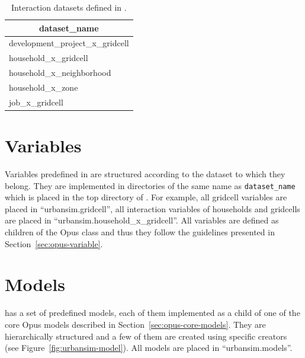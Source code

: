 \begin{table}
\begin{center}
\begin{tabular}{|l|}\hline
\multicolumn{1}{|c|}{dataset_name}  \\\hline\hline
development_project_x_gridcell \\
household_x_gridcell \\
household_x_neighborhood \\
household_x_zone \\
job_x_gridcell \\\hline
\end{tabular}
\end{center}
\caption{\label{tab:urbansim-interaction-datasets}Interaction datasets defined
  in . }
\end{table}

\section{Variables}
\variablesindex
%
Variables \variablesindex predefined in  are structured according to the
dataset \datasetindex to which they belong. They are implemented in directories of the same
name as \verb|dataset_name| \datasetindex which is placed in the top directory of
. For example, all gridcell variables \variablesindex are placed in
``urbansim.gridcell'', all interaction variables \variablesindex of households and
gridcells are placed in ``urbansim.household_x_gridcell''. All variables \variablesindex
are defined as children of the Opus  class  \variablesindex and
thus they follow the guidelines presented in Section~\ref{sec:opus-variable}.

\section{Models}
\label{sec:urbansim-models}
\modelsindex

 has a set of predefined models, \modelsindex each
of them implemented as a child of one of the core Opus models
\modelsindex described in Section~\ref{sec:opus-core-models}.  They
are hierarchically structured and a few of them are created using
specific creators (see Figure~\ref{fig:urbansim-model}).  All
 models \modelsindex are placed in
``urbansim.models''.

